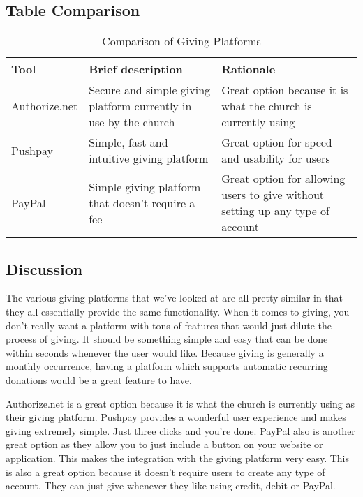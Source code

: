 \documentclass[letterpaper,10pt,draftclsnofoot,onecolumn,titlepage]{IEEEtran}
\begin{document}
	\subsection{Table Comparison}
		\begin{table}[ht]
		\caption{Comparison of Giving Platforms}
			\begin{center}
			\begin{tabular} { | m{3cm} | m{5cm} | m{5cm} | }
				\hline\hline
				Tool & Brief description & Rationale \\ [0.5ex]
				\hline
				Authorize.net & Secure and simple giving platform currently in use by the church & Great option because it is what the church is currently using \\
				\hline
				Pushpay & Simple, fast and intuitive giving platform & Great option for speed and usability for users \\
				\hline
				PayPal & Simple giving platform that doesn't require a fee & Great option for allowing users to give without setting up any type of account \\
				\hline
			\end{tabular}
			\end{center}
		\end{table}

	\subsection{Discussion}
		The various giving platforms that we've looked at are all pretty similar in that they all essentially provide the same functionality.
		When it comes to giving, you don't really want a platform with tons of features that would just dilute the process of giving.
		It should be something simple and easy that can be done within seconds whenever the user would like.
		Because giving is generally a monthly occurrence, having a platform which supports automatic recurring donations would be a great feature to have.

		Authorize.net is a great option because it is what the church is currently using as their giving platform.
		Pushpay provides a wonderful user experience and makes giving extremely simple.
		Just three clicks and you're done.
		PayPal also is another great option as they allow you to just include a button on your website or application.
		This makes the integration with the giving platform very easy.
		This is also a great option because it doesn't require users to create any type of account.
		They can just give whenever they like using credit, debit or PayPal.
\end{document}
